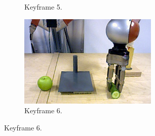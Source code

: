\begin{figure}
\begin{subfigure}[t]{0.475\textwidth}
    \caption{Keyframe 5.}
    \label{fig:sec_usingaffordanceforplanning_results_scenario4_5}
  \end{subfigure}
  \hfill
  \begin{subfigure}[t]{0.475\textwidth}
    \includegraphics[width=\textwidth]{./figures/sec/planning/exec4/frame2456.jpg}
    \caption{Keyframe 6.}
    \label{fig:sec_usingaffordanceforplanning_results_scenario4_6}
  \end{subfigure}
\end{figure}
